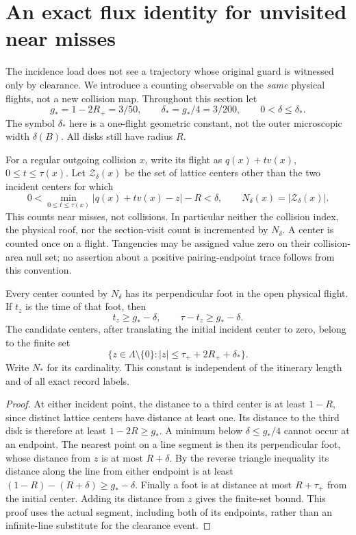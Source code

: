 \section{An exact flux identity for unvisited near misses}
\label{sec:cf-flux}
The incidence load does not see a trajectory whose original guard is
witnessed only by clearance. We introduce a counting observable on the
\emph{same} physical flights, not a new collision map. Throughout this
section let
\[
 g_*=1-2R_+=3/50,\qquad \delta_*=g_*/4=3/200,
 \qquad 0<\delta\le\delta_*.
\]
The symbol $\delta_*$ here is a one-flight geometric constant, not the
outer microscopic width $\delta(B)$. All disks still have radius $R$.

For a regular outgoing collision $x$, write its flight as
$q(x)+tv(x)$, $0\le t\le\tau(x)$. Let $\mathcal Z_\delta(x)$ be the
set of lattice centers other than the two incident centers for which
\[
 0<\min_{0\le t\le\tau(x)}|q(x)+tv(x)-z|-R<\delta,
 \qquad N_\delta(x)=|\mathcal Z_\delta(x)|.
\]
This counts near misses, not collisions. In particular neither the
collision index, the physical roof, nor the section-visit count is
incremented by $N_\delta$. A center is counted once on a flight.
Tangencies may be assigned value zero on their collision-area null set;
no assertion about a positive pairing-endpoint trace follows from this
convention.

\begin{lemma}
\label{lem:cf-foot}
Every center counted by $N_\delta$ has its perpendicular foot in the
open physical flight. If $t_z$ is the time of that foot, then
\begin{equation}\label{eq:cf-gap}
 t_z\ge g_*-\delta,\qquad \tau-t_z\ge g_*-\delta.
\end{equation}
The candidate centers, after translating the initial incident center
to zero, belong to the finite set
\[
 \{z\in\Lambda\setminus\{0\}:|z|\le\tau_++2R_++\delta_*\}.
\]
Write $N_*$ for its cardinality. This constant is independent of the
itinerary length and of all exact record labels.
\end{lemma}
\begin{proof}
At either incident point, the distance to a third center is at least
$1-R$, since distinct lattice centers have distance at least one.
Its distance to the third disk is therefore at least $1-2R\ge g_*$.
A minimum below $\delta\le g_*/4$ cannot occur at an endpoint. The
nearest point on a line segment is then its perpendicular foot, whose
distance from $z$ is at most $R+\delta$. By the reverse triangle
inequality its distance along the line from either endpoint is at
least $(1-R)-(R+\delta)\ge g_*-\delta$. Finally a foot is at distance
at most $R+\tau_+$ from the initial center. Adding its distance from
$z$ gives the finite-set bound. This proof uses the actual segment,
including both of its endpoints, rather than an infinite-line
substitute for the clearance event.
\end{proof}


